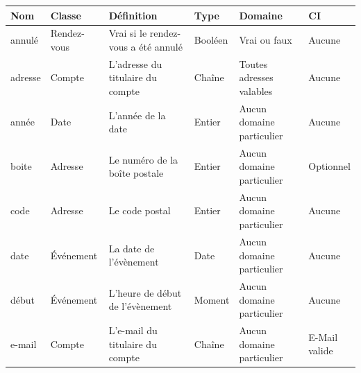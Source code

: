 \begin{center}
\begin{longtable}{|p{2cm}|p{2cm}|p{3cm}|p{2cm}|p{2cm}|p{2cm}|}
		\hline
		Nom & Classe & Définition & Type & Domaine & CI \\
		\hline
		annulé & Rendez-vous & \parbox[t]{3cm}{Vrai si le rendez-vous a été annulé\\} &
        Booléen & Vrai ou faux & Aucune \\
		\hline
        adresse & Compte & \parbox[t]{3cm}{L'adresse du titulaire du compte\\} & Chaîne 
        & \parbox[t]{2cm}{Toutes adresses valables\\} & Aucune \\
        \hline
        année & Date & L'année de la date & Entier & \parbox[t]{2cm}{Aucun\\ domaine particulier\\} & Aucune \\
        \hline
        boite & Adresse & \parbox[t]{3cm}{Le numéro de la boîte postale\\} & Entier & \parbox[t]{2cm}{Aucun\\ domaine particulier\\} &
        Optionnel \\
        \hline
        code & Adresse & \parbox[t]{3cm}{Le code postal\\} & Entier & \parbox[t]{2cm}{Aucun\\ domaine particulier\\} & Aucune \\
        \hline
        date & Événement & \parbox[t]{3cm}{La date de l'évènement\\} & Date & \parbox[t]{2cm}{Aucun\\ domaine particulier\\} &
        Aucune \\
        \hline
        début & Événement & \parbox[t]{3cm}{L'heure de début de l'évènement\\} & Moment & \parbox[t]{2cm}{Aucun\\ domaine particulier\\} &
        Aucune \\
        \hline
        e-mail & Compte & \parbox[t]{3cm}{L'e-mail du titulaire du compte\\} & Chaîne & \parbox[t]{2cm}{Aucun\\ domaine particulier\\}
        & \parbox[t]{2cm}{E-Mail\\ valide} \\

\end{longtable}
\end{center}
